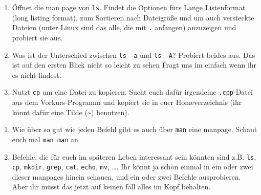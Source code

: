 \begin{praxis}
      \begin{enumerate}[resume]
      \item Öffnet die man page von \texttt{ls}. Findet die Optionen fürs Lange
                              Listenformat (long listing format), zum Sortieren nach Dateigröße
                              und um auch versteckte Dateien (unter Linux sind das alle, die mit
                              \texttt{.} anfangen) anzuzeigen und probiert sie aus.
      \item Was ist der Unterschied zwischen \texttt{ls -a} und \texttt{ls -A}?
            Probiert beides aus. Das ist auf den ersten Blick nicht so leicht zu sehen
                              Fragt uns im einfach wenn ihr es nicht findest.
      \item Nutzt \texttt{cp} um eine Datei zu kopieren. Sucht euch dafür
            irgendeine \texttt{.cpp}-Datei aus dem Vorkurs-Programm und kopiert sie
            in euer Homeverzeichnis (ihr könnt dafür eine Tilde (\texttt{\~})
            benutzen).
      \end{enumerate}
\end{praxis}

\begin{spiel}
    \begin{enumerate}
        \item Wie über so gut wie jeden Befehl gibt es auch über \texttt{man} eine
              manpage. Schaut euch mal \texttt{man man} an.
        \item Befehle, die für euch im späteren Leben interessant sein könnten sind
              z.B. \texttt{ls}, \texttt{cp}, \texttt{mkdir}, \texttt{grep}, \texttt{cat},
              \texttt{echo}, \texttt{mv}, \dots. Ihr könnt ja schon einmal in ein
              oder zwei dieser manpages hinein schauen, und ein oder zwei Befehle
              ausprobieren. Aber ihr müsst das jetzt auf keinen fall alles im Kopf
              behalten.
    \end{enumerate}
\end{spiel}
